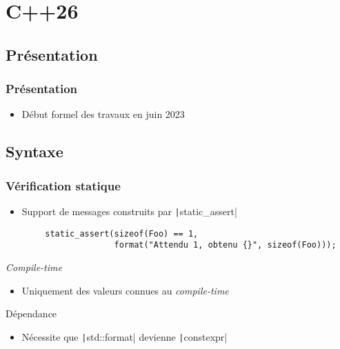 \documentclass[C++.tex]{subfiles}
\begin{document}
\section{C++26}
\subsection*{Présentation}
\begin{frame}
	\frametitle{Présentation}
	\begin{itemize}
		\item Début formel des travaux en juin 2023
	\end{itemize}
\end{frame}

\subsection*{Syntaxe}
\begin{frame}[fragile]
	\frametitle{Vérification statique}
	\begin{itemize}
		\item Support de messages construits par \texttt|static_assert|
	\end{itemize}

	\begin{verbatim}
		static_assert(sizeof(Foo) == 1,
		              format("Attendu 1, obtenu {}", sizeof(Foo)));
	\end{verbatim}

	\begin{alertblock}{\textit{Compile-time}}
		\begin{itemize}
			\item Uniquement des valeurs connues au \textit{compile-time}
		\end{itemize}
	\end{alertblock}

	\begin{alertblock}{Dépendance}
		\begin{itemize}
			\item Nécessite que \texttt|std::format| devienne \texttt|constexpr|
		\end{itemize}
	\end{alertblock}
\end{frame}
\end{document}
